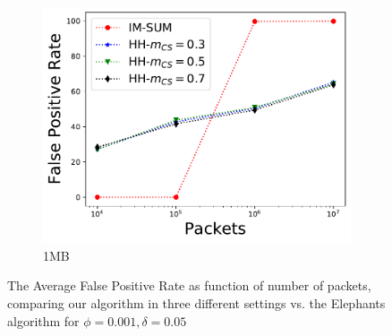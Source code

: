 \begin{figure}
\begin{subfigure}[t]{0.32\textwidth}
    \includegraphics[width=\linewidth]{HH/figures/FPR_per_pkts_m=1.0.pdf}
    \caption{1MB}
    \label{fig:fig3_f}
\end{subfigure}

\caption{The Average False Positive Rate as function of number of packets, comparing our algorithm in three different settings vs. the Elephants algorithm for $\phi=0.001,\delta=0.05$}
\label{figure3}
\end{figure}
